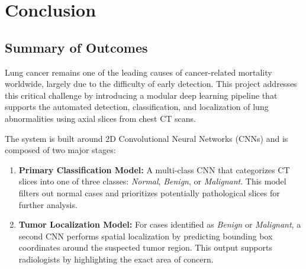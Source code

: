 
\section{Conclusion}


\subsection{Summary of Outcomes}

Lung cancer remains one of the leading causes of cancer-related mortality worldwide, largely due to 
the difficulty of early detection. This project addresses this critical challenge by introducing a 
modular deep learning pipeline that supports the automated detection, classification, and 
localization of lung abnormalities using axial slices from chest CT scans.

The system is built around 2D Convolutional Neural Networks (CNNs) and is composed of two major stages:

\begin{enumerate}
    \item \textbf{Primary Classification Model:} A multi-class CNN that categorizes CT slices into 
    one of three classes: \textit{Normal}, \textit{Benign}, or \textit{Malignant}. This model 
    filters out normal cases and prioritizes potentially pathological slices for further analysis.
    
    \item \textbf{Tumor Localization Model:} For cases identified as \textit{Benign} or 
    \textit{Malignant}, a second CNN performs spatial localization by predicting bounding box 
    coordinates around the suspected tumor region. This output supports radiologists by highlighting 
    the exact area of concern.
\end{enumerate}

